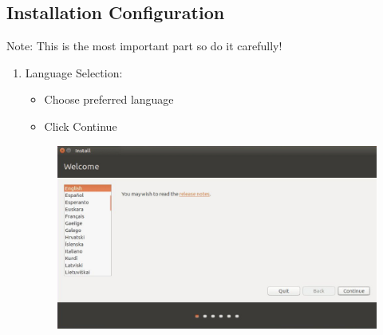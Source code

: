\documentclass[11pt,a4paper]{article}
\begin{document}
\subsection{Installation Configuration}
Note: This is the most important part so do it carefully!
\begin{enumerate}
    \item Language Selection:
    \begin{itemize}
        \item Choose preferred language
        \item Click Continue
    \end{itemize}
    \begin{figure}[htp]
        \centering
        \includegraphics[width=0.4\linewidth]{images/step5.png}
        \label{fig:enter-label}
    \end{figure}
    

\end{enumerate}
\end{document}
